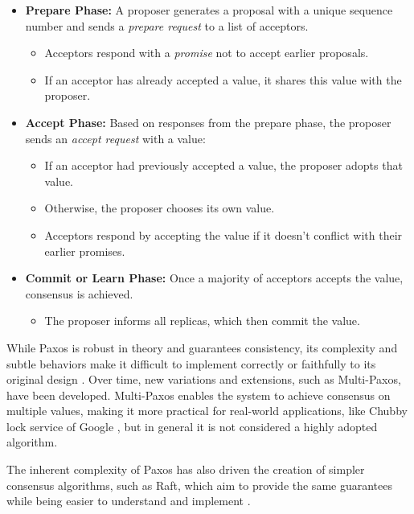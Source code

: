 \begin{itemize}
    \item \textbf{Prepare Phase:}
          A proposer generates a proposal with a unique sequence number and sends a \emph{prepare request} to a list of acceptors.
          \begin{itemize}
              \item Acceptors respond with a \textit{promise} not to accept earlier proposals.
              \item If an acceptor has already accepted a value, it shares this value with the proposer.
          \end{itemize}

    \item \textbf{Accept Phase:}
          Based on responses from the prepare phase, the proposer sends an \textit{accept request} with a value:
          \begin{itemize}
              \item If an acceptor had previously accepted a value, the proposer adopts that value.
              \item Otherwise, the proposer chooses its own value.
              \item Acceptors respond by accepting the value if it doesn’t conflict with their earlier promises.
          \end{itemize}

    \item \textbf{Commit or Learn Phase:}
          Once a majority of acceptors accepts the value, consensus is achieved.
          \begin{itemize}
              \item The proposer informs all replicas, which then commit the value.
          \end{itemize}
\end{itemize}

While Paxos is robust in theory and guarantees consistency, its complexity and subtle behaviors make it difficult to implement correctly or faithfully to its original design \cite{Tanenbaum2023}. Over time, new variations and extensions, such as Multi-Paxos, have been developed. Multi-Paxos enables the system to achieve consensus on multiple values, making it more practical for real-world applications, like Chubby lock service of Google \cite{Coulouris2012}, but in general it is not considered a highly adopted algorithm.

The inherent complexity of Paxos has also driven the creation of simpler consensus algorithms, such as Raft, which aim to provide the same guarantees while being easier to understand and implement \cite{Tanenbaum2023, Howard2020}.

